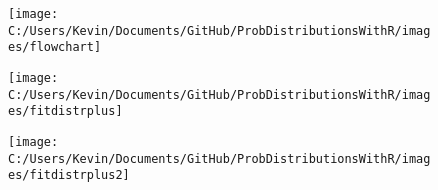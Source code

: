 \documentclass[MAIN.tex]{subfiles}
\begin{document}
 
	\begin{frame}
		\begin{figure}
\centering
\texttt{[image: C:/Users/Kevin/Documents/GitHub/ProbDistributionsWithR/images/flowchart]}

\end{figure}

	\end{frame}
	\begin{frame}
		\begin{figure}
\centering
\texttt{[image: C:/Users/Kevin/Documents/GitHub/ProbDistributionsWithR/images/fitdistrplus]}

\end{figure}

	\end{frame}
	\begin{frame}
		\begin{figure}
\centering
\texttt{[image: C:/Users/Kevin/Documents/GitHub/ProbDistributionsWithR/images/fitdistrplus2]}
\caption{}
\label{fig:fitdistrplus2}
\end{figure}

	\end{frame}
\end{document}
